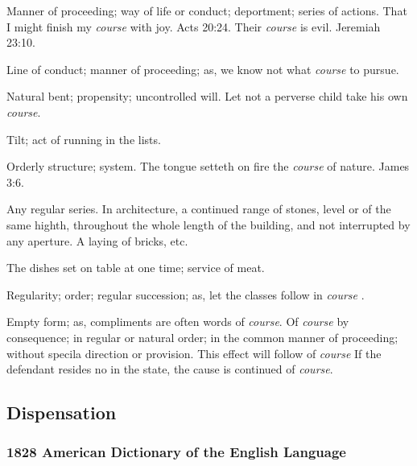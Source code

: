 \begin{compactitem}
				\item Manner of proceeding; way of life or conduct; deportment; series of actions. That I might finish my \textit{course} with joy. Acts 20:24. Their \textit{course} is evil. Jeremiah 23:10.
				\item Line of conduct; manner of proceeding; as, we know not what \textit{course} to pursue.
				\item Natural bent; propensity; uncontrolled will. Let not a perverse child take his own \textit{course}.
				\item Tilt; act of running in the lists.
				\item Orderly structure; system. The tongue setteth on fire the \textit{course} of nature. James 3:6.
				\item Any regular series. In architecture, a continued range of stones, level or of the same highth, throughout the whole length of the building, and not interrupted by any aperture. A laying of bricks, etc. 
				\item The dishes set on table at one time; service of meat. 
				\item Regularity; order; regular succession; as, let the classes follow in \textit{course} .
				\item Empty form; as, compliments are often words of \textit{course}. Of \textit{course} by consequence; in regular or natural order; in the common manner of proceeding; without specila direction or provision. This effect will follow of \textit{course} If the defendant resides no in the state, the cause is continued of \textit{course}.
			\end{compactitem}


	\subsection{Dispensation} %
		\label{DISPENSATION}
		
		\subsubsection{1828 American Dictionary of the English Language}
		
